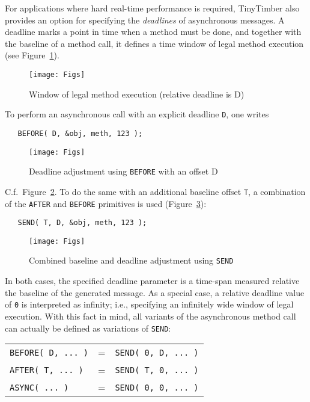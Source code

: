 \documentclass[12pt]{article}
\begin{document}
For applications where hard real-time performance is required, TinyTimber also provides an option for specifying the {\em deadlines} of asynchronous messages.  A deadline marks a point in time when a method must be done, and together with the baseline of a method call, it defines a time window of legal method execution (see Figure~\ref{fig:deadline}).  

\begin{figure}
\begin{center}
\texttt{[image: Figs]}
\caption{\label{fig:deadline}Window of legal method execution (relative deadline is D)}
\end{center}
\end{figure}

To perform an asynchronous call with an explicit deadline {\tt D}, one writes
\begin{verbatim}
   BEFORE( D, &obj, meth, 123 );
\end{verbatim}
\begin{figure}
\begin{center}
\texttt{[image: Figs]}
\caption{\label{fig:before}Deadline adjustment using {\tt BEFORE} with an offset D}
\end{center}
\end{figure}
C.f.\ Figure~\ref{fig:before}. To do the same with an additional baseline offset {\tt T}, a combination of the {\tt AFTER} and {\tt BEFORE} primitives is used (Figure~\ref{fig:send}):
\begin{verbatim}
   SEND( T, D, &obj, meth, 123 );
\end{verbatim}
\begin{figure}
\begin{center}
\texttt{[image: Figs]}
\caption{\label{fig:send}Combined baseline and deadline adjustment using {\tt SEND}}
\end{center}
\end{figure}
In both cases, the specified deadline parameter is a time-span measured relative the baseline of the generated message. As a special case, a relative deadline value of {\tt 0} is interpreted as infinity; i.e., specifying an infinitely wide window of legal execution. With this fact in mind, all variants of the asynchronous method call can actually be defined as variations of {\tt SEND}:
\begin{center}
\begin{tabular}{lll}
    {\tt BEFORE( D, ... )} & = & {\tt SEND( 0, D, ... )} \\
    {\tt AFTER( T, ... )}  & = & {\tt SEND( T, 0, ... )} \\
    {\tt ASYNC( ... )}     & = & {\tt SEND( 0, 0, ... )}
\end{tabular}
\end{center}
\end{document}
